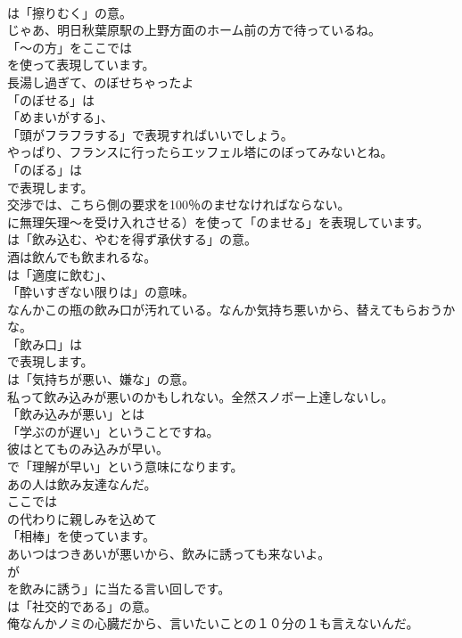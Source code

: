 \documentclass[8pt]{extreport}
\begin{document}
\begin{CJK}{UTF8}{min}
\\	は「擦りむく」の意。	
\\	じゃあ、明日秋葉原駅の上野方面のホーム前の方で待っているね。 
\\	「～の方」をここでは
\\	を使って表現しています。	
\\	長湯し過ぎて、のぼせちゃったよ 
\\	「のぼせる」は
\\	「めまいがする」、
\\	「頭がフラフラする」で表現すればいいでしょう。	
\\	やっぱり、フランスに行ったらエッフェル塔にのぼってみないとね。 
\\	「のぼる」は
\\	で表現します。	
\\	交渉では、こちら側の要求を100％のませなければならない。 
\\	に無理矢理～を受け入れさせる）を使って「のませる」を表現しています。
\\	は「飲み込む、やむを得ず承伏する」の意。	
\\	酒は飲んでも飲まれるな。 
\\	は「適度に飲む」、
\\	「酔いすぎない限りは」の意味。	
\\	なんかこの瓶の飲み口が汚れている。なんか気持ち悪いから、替えてもらおうかな。 
\\	「飲み口」は
\\	で表現します。
\\	は「気持ちが悪い、嫌な」の意。	
\\	私って飲み込みが悪いのかもしれない。全然スノボー上達しないし。 
\\	「飲み込みが悪い」とは
\\	「学ぶのが遅い」ということですね。	
\\	彼はとてものみ込みが早い。 
\\	で「理解が早い」という意味になります。	
\\	あの人は飲み友達なんだ。 
\\	ここでは
\\	の代わりに親しみを込めて
\\	「相棒」を使っています。	
\\	あいつはつきあいが悪いから、飲みに誘っても来ないよ。 
\\	が
\\	を飲みに誘う」に当たる言い回しです。
\\	は「社交的である」の意。	
\\	俺なんかノミの心臓だから、言いたいことの１０分の１も言えないんだ。 

\end{CJK}
\end{document}
